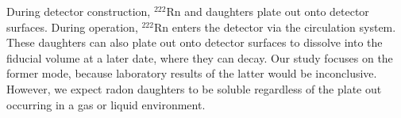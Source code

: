 During detector construction, $^{222}$Rn and daughters plate out onto detector surfaces. During operation, $^{222}$Rn enters the detector via the circulation system. These daughters can also plate out onto detector surfaces to dissolve into the fiducial volume at a later date, where they can decay. Our study focuses on the former mode, because laboratory results of the latter would be inconclusive. However, we expect radon daughters to be soluble regardless of the plate out occurring in a gas or liquid environment.




